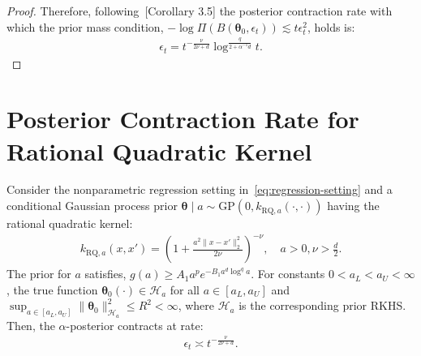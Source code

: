 \documentclass[final,12pt]{colt2026} %
\begin{document}
\begin{proof}
Therefore, following~\cite{bhattacharya2019bayesian}[Corollary 3.5] the posterior contraction rate with which the prior mass condition, $-\log \Pi(B(\pmb\theta_0, \epsilon_t)) \lesssim t\epsilon_t^2$, holds is:
\begin{align}
\label{eq:matern-contraction-5}
\epsilon_t = t^{-\frac{\nu}{2\nu+d}}\log^{\frac{q}{2 + \alpha^{-1}d}}t.
\end{align}
\end{proof}

\section{Posterior Contraction Rate for Rational Quadratic Kernel}
\label{app:rq-contraction-rate}

\begin{lemma}
\label{lemma:rq-contraction-rate}
Consider the nonparametric regression setting in~\eqref{eq:regression-setting} and a conditional Gaussian process prior $\pmb\theta\mid a\sim \mathrm{GP}(0, k_{\mathrm{RQ}, a}(\cdot, \cdot))$ having the rational quadratic kernel:
\begin{align*}
k_{\mathrm{RQ}, a}(x, x') = \left(1 + \frac{a^{2}\lVert x - x'\rVert_{2}^{2}}{2\nu}\right)^{-\nu},\quad a>0, \nu>\frac{d}{2}.
\end{align*}
The prior for $a$ satisfies, $g(a) \geq A_1 a^{p}e^{-B_1 a^{d}\log^{q}a}$. For constants $0<a_L < a_U < \infty$, the true function $\pmb\theta_0(\cdot) \in \mathcal{H}_a$ for all $a\in [a_L, a_U]$ and $\sup_{a\in [a_L, a_U]}\lVert \pmb\theta_0\rVert_{\mathcal{H}_a}^{2} \leq R^{2} < \infty$, where $\mathcal{H}_a$ is the corresponding prior RKHS. Then, the $\alpha$-posterior contracts at rate:
\begin{align*}
\epsilon_t \asymp t^{-\frac{\nu}{2\nu+d}}.
\end{align*}
\end{lemma}
\end{document}
